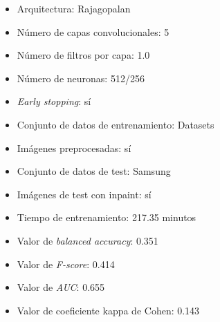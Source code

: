 \begin{itemize}
    \item Arquitectura: Rajagopalan
    \item Número de capas convolucionales: 5
    \item Número de filtros por capa: 1.0
    \item Número de neuronas: 512/256
    \item \textit{Early stopping}: sí
    \item Conjunto de datos de entrenamiento: Datasets
    \item Imágenes preprocesadas: sí
    \item Conjunto de datos de test: Samsung
    \item Imágenes de test con inpaint: sí
    \item Tiempo de entrenamiento: 217.35 minutos
    \item Valor de \textit{balanced accuracy}: 0.351
    \item Valor de \textit{F-score}: 0.414
    \item Valor de \textit{AUC}: 0.655
    \item Valor de coeficiente kappa de Cohen: 0.143
\end{itemize}